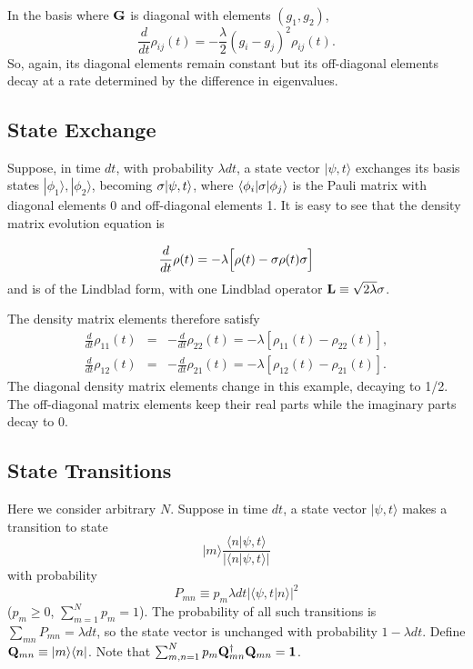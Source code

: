 \documentclass[aps,pra,twocolumn,amssymb, amsfonts,amsmath,showpacs, superscriptaddress]{revtex4}
\begin{document}
In the basis where ${\bf G}$ is diagonal with elements $(g_{1},g_{2})$, 
\[
\frac{d}{dt}\rho_{ij}(t)=-\frac{\lambda}{2}(g_{i}-g_{j})^{2}\rho_{ij}(t). 
\]
\noindent So, again, its diagonal elements remain constant but its off-diagonal elements decay at a rate determined by the difference in eigenvalues. 

\subsection{State Exchange}
Suppose, in time $dt$, with probability $\lambda dt$, a state vector $|\psi, t\rangle$  exchanges its basis states $|\phi_{1}\rangle, |\phi_{2}\rangle$, becoming ${\bf\sigma}|\psi, t\rangle$, where  
$\langle\phi_{i}| {\bf \sigma}|\phi_{j}\rangle$ is the Pauli matrix with diagonal elements 0 and off-diagonal elements 1.    It is easy to see that the density matrix evolution equation is 

\[
\frac{d}{dt}{\bf \rho}(t)=-\lambda\Big[{\bf \rho}(t)-{\bf\sigma} {\bf \rho}(t){\bf\sigma}\Big]
\] 
\noindent and  is of the Lindblad form, with one Lindblad operator ${\bf L}\equiv \sqrt{2\lambda}{\bf\sigma}$.

The density matrix elements therefore satisfy
\begin{eqnarray}
\frac{d}{dt} \rho_{11}(t)&=&-\frac{d}{dt} \rho_{22}(t)=- \lambda[\rho_{11}(t)- \rho_{22}(t)],\nonumber\\
\frac{d}{dt} \rho_{12}(t)&=&-\frac{d}{dt} \rho_{21}(t)=- \lambda[\rho_{12}(t)- \rho_{21}(t)].\nonumber
\end{eqnarray}
\noindent The diagonal density matrix elements change in this example, decaying to 1/2.  The off-diagonal matrix elements keep their real parts while the imaginary parts decay to 0.

\subsection{State Transitions}
Here we consider arbitrary $N$. Suppose in time $dt$, a state vector $|\psi, t\rangle$  makes a transition to state  
\[
|m\rangle \frac{\langle n| \psi, t\rangle}{|\langle n| \psi, t\rangle|}
\]
\noindent with probability
\[
P_{mn}\equiv p_{m} \lambda dt|\langle \psi, t| n\rangle|^{2}
\]
\noindent ($p_{m}\geq 0$,  $ \sum_{m=1}^{N}p_{m}=1$).  The probability of all such transitions is $\sum_{mn}P_{mn}=\lambda dt$, so the state vector is unchanged with probability $1-\lambda dt$.  Define  
${\bf Q}_{mn}\equiv | m\rangle \langle n|$.   Note that 
$\sum_{m,n=1}^{N}p_{m}{\bf Q}_{mn}^{\dagger}{\bf Q}_{mn}={\bf 1}$.
\end{document}
